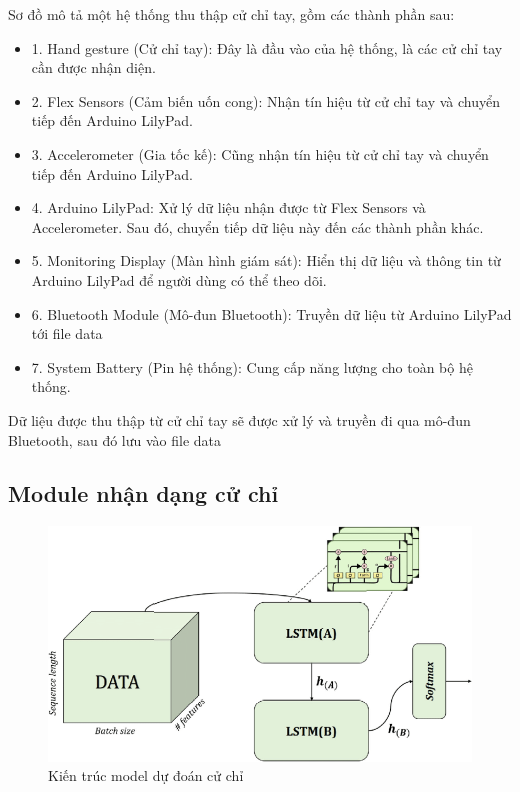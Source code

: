 Sơ đồ mô tả một hệ thống thu thập cử chỉ tay, gồm các thành phần sau:
\begin{itemize}
\item 1. Hand gesture (Cử chỉ tay): Đây là đầu vào của hệ thống, là các cử chỉ tay cần được nhận diện.
\item 2. Flex Sensors (Cảm biến uốn cong): Nhận tín hiệu từ cử chỉ tay và chuyển tiếp đến Arduino LilyPad.
\item 3. Accelerometer (Gia tốc kế): Cũng nhận tín hiệu từ cử chỉ tay và chuyển tiếp đến Arduino LilyPad.
\item 4. Arduino LilyPad: Xử lý dữ liệu nhận được từ Flex Sensors và Accelerometer. Sau đó, chuyển tiếp dữ liệu này đến các thành phần khác.
\item 5. Monitoring Display (Màn hình giám sát): Hiển thị dữ liệu và thông tin từ Arduino LilyPad để người dùng có thể theo dõi.
\item 6. Bluetooth Module (Mô-đun Bluetooth): Truyền dữ liệu từ Arduino LilyPad tới file data
\item 7. System Battery (Pin hệ thống): Cung cấp năng lượng cho toàn bộ hệ thống.
\end{itemize}


Dữ liệu được thu thập từ cử chỉ tay sẽ được xử lý và truyền đi qua mô-đun Bluetooth, sau đó lưu vào file data
\subsection{Module nhận dạng cử chỉ}
\begin{figure}[H]
    \centering
    \includegraphics[width=\textwidth,height=\textheight,keepaspectratio]{Images/Theoretical basis/lstm model.png}
    \caption{Kiến trúc model dự đoán cử chỉ}
    \label{fig:enter-label}
\end{figure}

